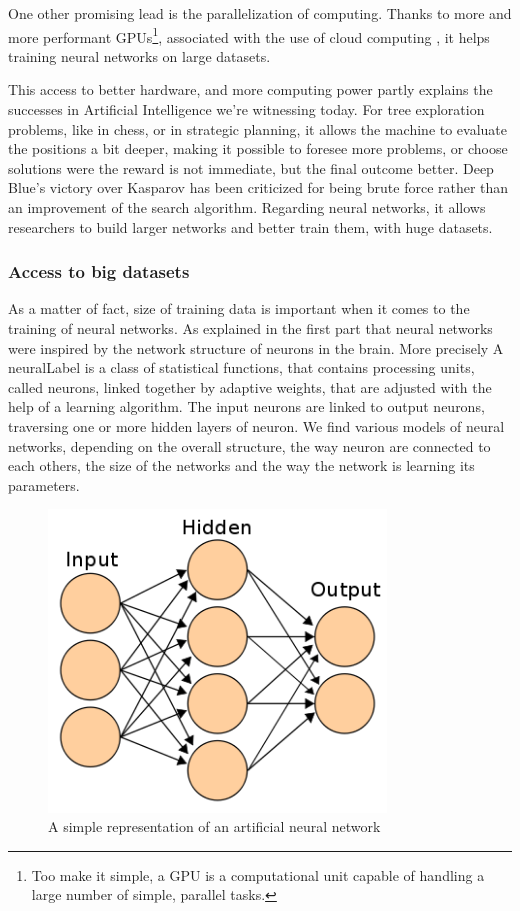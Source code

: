 \documentclass[12pt]{article}
\begin{document}
One other promising lead is the parallelization of computing. Thanks to more and
more performant GPUs\footnote{Too make it simple, a GPU is a computational unit
capable of handling a large number of simple, parallel tasks.}, associated  with  the use of cloud
computing \cite{cloud}, it helps training neural networks on large datasets.

This access to better hardware, and more computing power partly explains the
successes in Artificial Intelligence we're witnessing today. For tree
exploration problems, like in chess, or in strategic planning, it allows the
machine to evaluate the positions a bit deeper, making it possible to foresee
more problems, or choose solutions were the reward is not immediate, but the
final outcome better. Deep Blue's victory  over Kasparov has been criticized for
being brute force rather than an improvement of the search algorithm. Regarding
neural networks, it allows researchers to build larger networks and better train
them, with huge datasets.

\subsubsection{Access to big datasets}


As a matter of fact, size of training data is important when it comes to the
training of neural networks. As explained in the first part that neural networks were
inspired by the network structure of neurons in the brain. More precisely A \gls{neuralLabel} is a class of statistical
functions, that contains processing units, called neurons, linked together by
adaptive weights, that are adjusted with the help of a learning algorithm.
The input neurons are linked to output neurons, traversing one or more hidden
layers of neuron. We find various models of neural networks, depending on the
overall  structure, the way neuron are connected to each others, the size of
the networks and the way the network is learning its parameters.

\begin{figure}[ht]
    \centering
    \includegraphics[width=0.8\textwidth]{ann}
    \caption{A simple representation of an artificial neural network}
    \label{fig:ann}
\end{figure}
\end{document}
